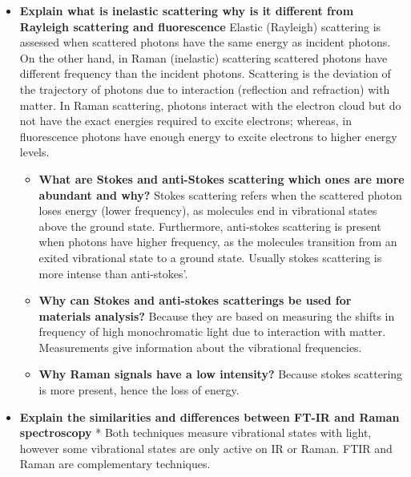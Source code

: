 \documentclass[11pt]{article}
\begin{document}
\begin{itemize}
  \item \relax \textbf{Explain what is inelastic scattering why is it different from Rayleigh scattering and fluorescence} \mbox{}\protect\newline * Elastic (Rayleigh) scattering is assessed when scattered photons have the same energy as incident photons. On the other hand, in Raman (inelastic) scattering scattered photons have different frequency than the incident photons. Scattering is the deviation of the trajectory of photons due to interaction (reflection and refraction) with matter. In Raman scattering, photons interact with the electron cloud but do not have the exact energies required to excite electrons; whereas, in fluorescence photons have enough energy to excite electrons to higher energy levels. \mbox{}\protect\newline 

\begin{itemize}
  \item \relax \textbf{What are Stokes and anti-Stokes scattering which ones are more abundant and why?} \mbox{}\protect\newline * Stokes scattering refers when the scattered photon loses energy (lower frequency), as molecules end in vibrational states above the ground state. Furthermore, anti-stokes scattering is present when photons have higher frequency, as the molecules transition from an exited vibrational state to a ground state. Usually stokes scattering is more intense than anti-stokes'. \mbox{}\protect\newline 
  \item \relax \textbf{Why can Stokes and anti-stokes scatterings be used for materials analysis?} \mbox{}\protect\newline * Because they are based on measuring the shifts in frequency of high monochromatic light due to interaction with matter. Measurements give information about the vibrational frequencies. \mbox{}\protect\newline 
  \item \relax \textbf{Why Raman signals have a low intensity?} \mbox{}\protect\newline * Because stokes scattering is more present, hence the loss of energy. \mbox{}\protect\newline 
\end{itemize}
  
  \item \relax \textbf{Explain the similarities and differences between FT-IR and Raman spectroscopy
}* Both techniques measure vibrational states with light, however some vibrational states are only active on IR or Raman. FTIR and Raman are complementary techniques.
\end{itemize}
  
\end{document}
